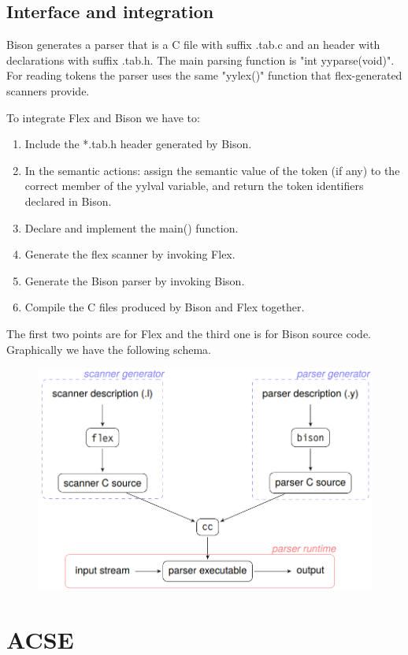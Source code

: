 \documentclass[12pt, a4paper]{report}
\newtheorem[style=M, bodystyle=\normalfont]{operation}{Operation}
\newtheorem[style=M, bodystyle=\normalfont]{theorem}{Theorem}
\newtheorem[style=M, bodystyle=\normalfont]{corollary}{Corollary}
\newtheorem[style=M, bodystyle=\normalfont]{lemma}{Lemma}
\newtheorem[style=M, bodystyle=\normalfont]{definition}{Definition}
\begin{document}
        \subsection{Interface and integration}
        Bison generates a parser that is a C file with suffix .tab.c and an header with declarations with suffix .tab.h. The main parsing function is "int yyparse(void)". 
        For reading tokens the parser uses the same "yylex()" function that flex-generated scanners provide. 

        To integrate Flex and Bison we have to: 
        \begin{enumerate}
            \item Include the *.tab.h header generated by Bison. 
            \item In the semantic actions: assign the semantic value of the token (if any) to the correct member of the yylval variable, and return the token identifiers 
                declared in Bison. 
            \item Declare and implement the main() function. 
            \item Generate the flex scanner by invoking Flex. 
            \item Generate the Bison parser by invoking Bison. 
            \item Compile the C files produced by Bison and Flex together. 
        \end{enumerate}
        The first two points are for Flex and the third one is for Bison source code. Graphically we have the following schema. 
        \begin{figure}[H]
            \centering
            \includegraphics[width=0.8\linewidth]{images/flbi.png}
        \end{figure}







    \section{ACSE}
\end{document}
